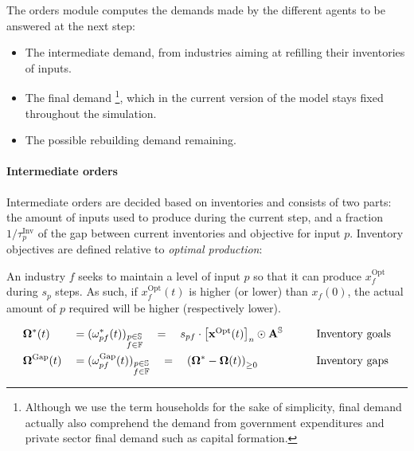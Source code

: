\documentclass[main.tex]{subfiles}
\begin{document}
The orders module computes the demands made by the different agents to be
answered at the next step:
\begin{itemize}
\item The intermediate demand, from industries aiming at refilling their
  inventories of inputs.
\item The final demand \footnote{Although we use the term households for the
    sake of simplicity, final demand actually also comprehend the demand from government
    expenditures and private sector final demand such as capital formation.}, which in the current
  version of the model stays fixed throughout the simulation.
\item The possible rebuilding demand remaining.
\end{itemize}


\paragraph{Intermediate orders}
\label{sec:intermediate-orders}

Intermediate orders are decided based on inventories and consists of two parts:
the amount of inputs used to produce during the current step, and a fraction
$1 / \tau^{\textrm{Inv}}_{p}$ of the gap between current inventories and
objective for input $p$.
Inventory objectives are defined relative to \emph{optimal production}:

An industry $f$ seeks to maintain a level of input $p$ so that it can produce
$x^{\textrm{Opt}}_f$  during $s_p$ steps. As such, if $x^{\textrm{Opt}}_f(t)$ is
higher (or lower) than $x_f(0)$, the actual amount of $p$ required will be
higher (respectively lower).

\begin{alignat*}{4}
  &\mathbf{\Omega}^{*}(t) &&= (\omega_{pf}^{*}(t))_{\substack{p \in \mathbb{S}\\f \in \mathbb{F}}} \quad = \quad s_{pf} \cdot \begin{bmatrix} \mathbf{x}^{\textrm{Opt}}(t) \end{bmatrix}_{n} \odot  \mathbf{A}^{\mathbb{S}} && \quad && \text{Inventory goals} \\
  &\mathbf{\Omega}^{\textrm{Gap}}(t) &&= (\omega_{pf}^{\textrm{Gap}}(t))_{\substack{p \in \mathbb{S}\\f \in \mathbb{F}}} \quad = \quad \left ( \mathbf{\Omega}^{*} - \mathbf{\Omega}(t) \right )_{\geq 0} && \quad && \text{Inventory gaps}\\
\end{alignat*}
\end{document}
